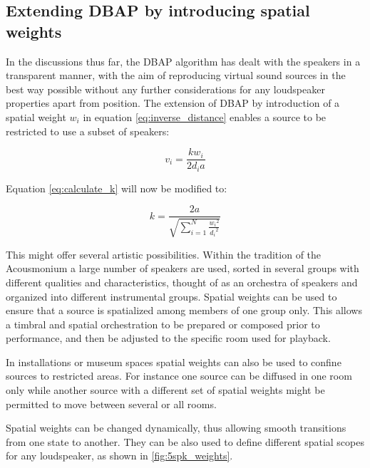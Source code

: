 \documentclass[twoside,10pt]{article}
\begin{document}
\subsection{Extending DBAP by introducing spatial weights}

In the discussions thus far, the DBAP algorithm has dealt with the speakers in a transparent manner, with the aim of reproducing virtual sound sources in the best way possible without any further considerations for any loudspeaker properties apart from position. The extension of DBAP by introduction of a spatial weight $w_{i}$ in equation \ref{eq:inverse_distance} enables a source to be restricted to use a subset of speakers:

\begin{equation} \label{eq:inverse_distance_weighed}
v_{i} = \frac{k w_{i}}{2 d_{i} a} 
\end{equation}

Equation \ref{eq:calculate_k} will now be modified to:

\begin{equation} \label{eq:calculate_k_weighted}
k = \frac{2a}{\sqrt{\sum_{i=1}^{N} \frac{{w_{i}}^2}{{d_{i}}^2}}}
\end{equation}

This might offer several artistic possibilities. Within the tradition of the Acousmonium \cite{Bayle:1993MusiqueAcousmatique} a large number of speakers are used, sorted in several groups with different qualities and characteristics, thought of as an orchestra of speakers and organized into different instrumental groups\cite{Prager:2002acousmatique}. Spatial weights can be used to ensure that a source is spatialized among members of one group only. This allows a timbral and spatial orchestration\cite{Lyon:2008spatial_orchestration} to be prepared or composed prior to performance, and then be adjusted to the specific room used for playback. 

In installations or museum spaces spatial weights can also be used to confine sources to restricted areas. For instance one source can be diffused in one room only while another source with a different set of spatial weights might be permitted to move between several or all rooms.

Spatial weights can be changed dynamically, thus allowing smooth transitions from one state to another. They can be also used to define different spatial scopes for any loudspeaker, as shown in \ref{fig:5spk_weights}.

\end{document}
